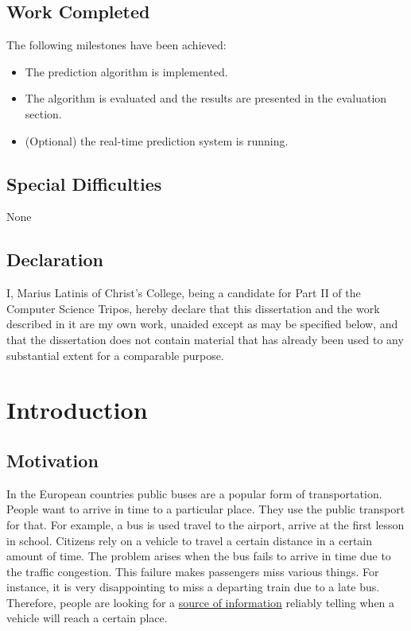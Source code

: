 \documentclass[12pt,a4paper,oneside,openright]{report}
\begin{document}
\section*{Work Completed}

The following milestones have been achieved:

\begin{itemize}
\item The prediction algorithm is implemented.
\item The algorithm is evaluated and the results are presented in the evaluation section.
\item (Optional) the real-time prediction system is running.
\end{itemize}

\section*{Special Difficulties}

None
 
\section*{Declaration}

I, Marius Latinis of Christ's College, being a candidate for Part II of the Computer
Science Tripos, hereby declare that this dissertation and the work described 
in it are my own work, unaided except as may be specified below,
and that the dissertation does not contain material that has already been used to any substantial extent for a comparable purpose.

\bigskip
{}

\medskip
{}

\tableofcontents


\pagestyle{plain}


\chapter{Introduction}

\section{Motivation}

In the European countries public buses are a popular form of transportation. People
want to arrive in time to a particular place. They use the public transport for that.
For example, a bus is used travel to the airport, arrive at the first lesson in
school. Citizens rely on a vehicle to travel a certain distance in a certain
amount of time. The problem arises when the bus fails to arrive in time due to the
traffic congestion. This failure makes passengers miss various things. For instance, it
is very disappointing to miss a departing train due to a late bus. Therefore,
people are looking for a \underline{source of information} reliably telling when a
vehicle will reach a certain place. \\
\end{document}
